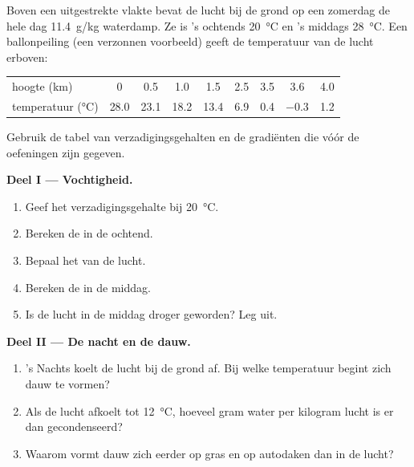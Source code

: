 \begin{problem}
\label{pb:g10:why-clouds-form:1}
Boven een uitgestrekte vlakte bevat de lucht bij de grond op een zomerdag de hele
dag \qty{11.4}{g/kg} waterdamp. Ze is 's ochtends \qty{20}{\degreeCelsius} en
's middags \qty{28}{\degreeCelsius}. Een ballonpeiling (een verzonnen voorbeeld)
geeft de temperatuur van de lucht erboven:

\begin{center}
\small
\begin{tabular}{l*{8}{c}}
\hline
hoogte (km) & 0 & 0.5 & 1.0 & 1.5 & 2.5 & 3.5 & 3.6 & 4.0 \\
temperatuur (\unit{\degreeCelsius}) & 28.0 & 23.1 & 18.2 & 13.4 & 6.9 & 0.4 & $-0.3$ & 1.2 \\
\hline
\end{tabular}
\end{center}

\noindent Gebruik de tabel van verzadigingsgehalten en de gradiënten die vóór de
oefeningen zijn gegeven.

\medskip
\noindent\textbf{Deel I --- Vochtigheid.}
\begin{enumerate}
  \item Geef het verzadigingsgehalte bij \qty{20}{\degreeCelsius}.
  \item Bereken de  in de ochtend.
  \item Bepaal het  van de lucht.
  \item Bereken de  in de middag.
  \item Is de lucht in de middag droger geworden? Leg uit.
\end{enumerate}

\medskip
\noindent\textbf{Deel II --- De nacht en de dauw.}
\begin{enumerate}[resume]
  \item 's Nachts koelt de lucht bij de grond af. Bij welke temperatuur begint
        zich dauw te vormen?
  \item Als de lucht afkoelt tot \qty{12}{\degreeCelsius}, hoeveel gram water
        per kilogram lucht is er dan gecondenseerd?
  \item Waarom vormt dauw zich eerder op gras en op autodaken dan in de
        lucht?
\end{enumerate}


\end{problem}
